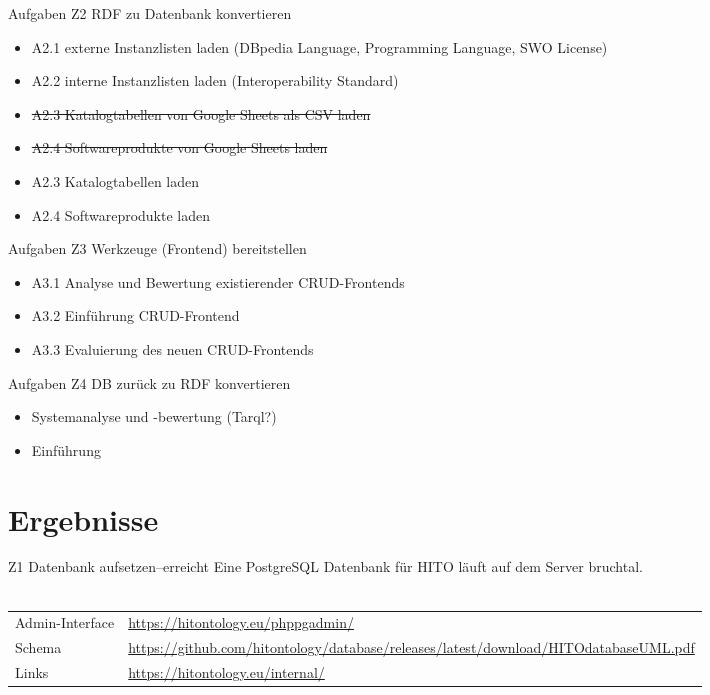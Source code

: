 \documentclass[aspectratio=169]{beamer}
\begin{document}
\begin{frame}{Aufgaben Z2 RDF zu Datenbank konvertieren}
\begin{itemize}
\item A2.1 externe Instanzlisten laden (DBpedia Language, Programming Language, SWO License) \checkmark
\item A2.2 interne Instanzlisten laden (Interoperability Standard) \checkmark
\item \sout{A2.3 Katalogtabellen von Google Sheets als CSV laden}
\item \sout{A2.4 Softwareprodukte von Google Sheets laden}
\item A2.3 Katalogtabellen laden
\item A2.4 Softwareprodukte laden
\end{itemize}
\end{frame}

\begin{frame}{Aufgaben Z3 Werkzeuge (Frontend) bereitstellen}
\begin{itemize}
\item A3.1 Analyse und Bewertung existierender CRUD-Frontends
\item A3.2 Einführung CRUD-Frontend
\item A3.3 Evaluierung des neuen CRUD-Frontends
\end{itemize}
\end{frame}

\begin{frame}{Aufgaben Z4 DB zurück zu RDF konvertieren}
\begin{itemize}
\item Systemanalyse und -bewertung (Tarql?)
\item Einführung
\end{itemize}
\end{frame}

\section{Ergebnisse}

\begin{frame}{Z1 Datenbank aufsetzen--erreicht}
Eine PostgreSQL Datenbank für HITO läuft auf dem Server bruchtal.\\
~\\
\begin{tabulary}{\textwidth}{lL}
Admin-Interface	&\url{https://hitontology.eu/phppgadmin/}\\
Schema		&\url{https://github.com/hitontology/database/releases/latest/download/HITOdatabaseUML.pdf}\\
Links		&\url{https://hitontology.eu/internal/}\\
\end{tabulary}
\end{frame}
\end{document}
